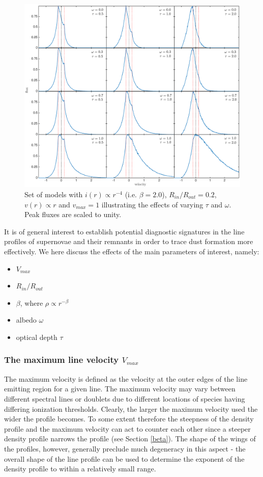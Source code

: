 \documentclass[useAMS,usenatbib,usegraphicx]{mnras}
\begin{document}
\begin{figure}
\includegraphics[trim =80 10 40 15,clip=true,scale=0.515]{params/C/C_all} 
\caption{Set of models with $i(r) \propto r^{-4}$ (i.e. $\beta=2.0$), $R_{in}/R_{out}=0.2$, $v(r) \propto r$  
and $v_{max}=1$ illustrating the effects of varying $\tau$ and $\omega$. 
Peak fluxes are scaled to unity.}
\label{wt}
\end{figure}


It is of general interest to establish potential diagnostic signatures in 
the line profiles of supernovae and their remnants in order to trace dust 
formation more effectively.  We here discuss the effects of the main 
parameters of interest, namely:

\begin{itemize}
\item $V_{max}$
\item $R_{in}/R_{out}$
\item $\beta$, where $\rho \propto r^{-\beta}$
\item albedo $\omega$ 
\item optical depth  $\tau$
\end{itemize}


\subsubsection{The maximum line velocity $V_{max}$}

The maximum velocity is defined as the velocity at the outer edges of 
the line emitting region for a given line.  The 
maximum velocity may vary between different spectral lines or doublets due 
to different locations of  species having differing ionization 
thresholds.  Clearly, the larger the maximum velocity used the wider the 
profile becomes.  To some extent therefore the steepness of the density 
profile and the maximum velocity can act to counter each other since a steeper 
density profile narrows the profile (see Section \ref{beta}).  The shape 
of the wings of the profiles, however, generally preclude much degeneracy 
in this aspect - the overall shape of the line profile can be used to determine the 
exponent of the density profile to within a relatively small range.
\end{document}
